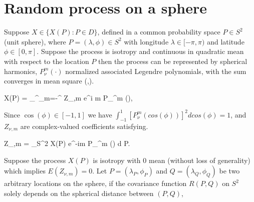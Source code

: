 
	\section{Random process on a sphere}
	
	
	
Suppose $X \in \{X(P): P\in D\}$, defined in a common probability space $P \in S^2$ (unit sphere), where $P=(\lambda, \phi) \in S^2$ with longitude $\lambda \in [-\pi, \pi)$ and latitude $\phi \in [0, \pi]$. Suppose the process is isotropy and continuous in quadratic mean with respect to the location $P$ then the process can be represented by spherical harmonics, $P_{\nu}^m(\cdot)$ normalized associated Legendre polynomials, with the sum converges in mean square (\cite{Jones1963},\cite{LiNorth1997, Huang2012}).   
		
		\beq \nonumber
		X(P) = \sum_{}^\infty \sum_{m=-\nu}^{\nu} Z_{\nu,m} e^{i m \lambda} P_{\nu}^m (\cos \phi),
		\eeq
		
		Since $\cos(\phi)\in[-1,1]$ we have $\int_{-1}^{1}[P_{\nu}^m(cos(\phi))]^2dcos(\phi) = 1$, and $Z_{\nu,m}$ are complex-valued coefficients satisfying.
		
		\beq \nonumber
		Z_{\nu,m} = \int_{S^2} X(P) e^{-im \lambda} P_{\nu}^m (\cos \phi) d P.
		\eeq
			
		Suppose the process $X(P)$ is isotropy with 0 mean (without loss of generality) which implies $E(Z_{\nu,m}) = 0$. Let $P = (\lambda_P, \phi_P)$ and $Q=(\lambda_Q, \phi_Q)$ be two arbitrary locations on the sphere, if the covariance function $R(P,Q)$ on $S^2$ solely depends on the spherical distance between $(P,Q)$,

